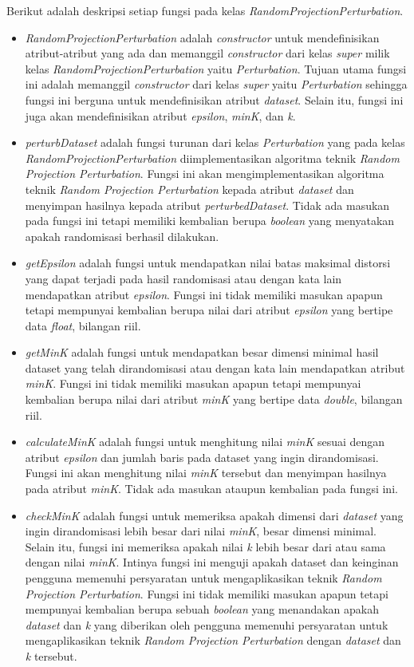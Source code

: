 Berikut adalah deskripsi setiap fungsi pada kelas \textit{RandomProjectionPerturbation}.
\begin{itemize}
	\item \textit{RandomProjectionPerturbation} adalah \textit{constructor} untuk mendefinisikan atribut-atribut yang ada dan memanggil \textit{constructor} dari kelas \textit{super} milik kelas \textit{RandomProjectionPerturbation} yaitu \textit{Perturbation}. Tujuan utama fungsi ini adalah memanggil \textit{constructor} dari kelas \textit{super} yaitu \textit{Perturbation} sehingga fungsi ini berguna untuk mendefinisikan atribut \textit{dataset}. Selain itu, fungsi ini juga akan mendefinisikan atribut \textit{epsilon}, \textit{minK}, dan \textit{k}.
	\item \textit{perturbDataset} adalah fungsi turunan dari kelas \textit{Perturbation} yang pada kelas \textit{RandomProjectionPerturbation} diimplementasikan algoritma teknik \textit{Random Projection Perturbation}. Fungsi ini akan mengimplementasikan algoritma teknik \textit{Random Projection Perturbation} kepada atribut \textit{dataset} dan menyimpan hasilnya kepada atribut \textit{perturbedDataset}. Tidak ada masukan pada fungsi ini tetapi memiliki kembalian berupa \textit{boolean} yang menyatakan apakah randomisasi berhasil dilakukan.
	\item \textit{getEpsilon} adalah fungsi untuk mendapatkan nilai batas maksimal distorsi yang dapat terjadi pada hasil randomisasi atau dengan kata lain mendapatkan atribut \textit{epsilon}. Fungsi ini tidak memiliki masukan apapun tetapi mempunyai kembalian berupa nilai dari atribut \textit{epsilon} yang bertipe data \textit{float}, bilangan riil.
	\item \textit{getMinK} adalah fungsi untuk mendapatkan besar dimensi minimal hasil dataset yang telah dirandomisasi atau dengan kata lain mendapatkan atribut \textit{minK}. Fungsi ini tidak memiliki masukan apapun tetapi mempunyai kembalian berupa nilai dari atribut \textit{minK} yang bertipe data \textit{double}, bilangan riil.
	\item \textit{calculateMinK} adalah fungsi untuk menghitung nilai \textit{minK} sesuai dengan atribut \textit{epsilon} dan jumlah baris pada dataset yang ingin dirandomisasi. Fungsi ini akan menghitung nilai \textit{minK} tersebut dan menyimpan hasilnya pada atribut \textit{minK}. Tidak ada masukan ataupun kembalian pada fungsi ini.
	\item \textit{checkMinK} adalah fungsi untuk memeriksa apakah dimensi dari \textit{dataset} yang ingin dirandomisasi lebih besar dari nilai \textit{minK}, besar dimensi minimal. Selain itu, fungsi ini memeriksa apakah nilai \textit{k} lebih besar dari atau sama dengan nilai \textit{minK}. Intinya fungsi ini menguji apakah dataset dan keinginan pengguna memenuhi persyaratan untuk mengaplikasikan teknik \textit{Random Projection Perturbation}. Fungsi ini tidak memiliki masukan apapun tetapi mempunyai kembalian berupa sebuah \textit{boolean} yang menandakan apakah \textit{dataset} dan \textit{k} yang diberikan oleh pengguna memenuhi persyaratan untuk mengaplikasikan teknik \textit{Random Projection Perturbation} dengan \textit{dataset} dan \textit{k} tersebut.

\end{itemize}
